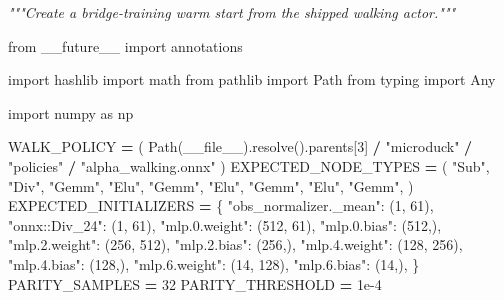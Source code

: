 \documentclass[
  american,
  11pt,
  letterpaper,
]{article}
\newenvironment{Shaded}{\begin{snugshade}}{\end{snugshade}}
\newcommand{\CommentTok}[1]{\textcolor[rgb]{0.56,0.35,0.01}{\textit{#1}}}
\newcommand{\DecValTok}[1]{\textcolor[rgb]{0.00,0.00,0.81}{#1}}
\newcommand{\FloatTok}[1]{\textcolor[rgb]{0.00,0.00,0.81}{#1}}
\newcommand{\ImportTok}[1]{#1}
\newcommand{\NormalTok}[1]{#1}
\newcommand{\OperatorTok}[1]{\textcolor[rgb]{0.81,0.36,0.00}{\textbf{#1}}}
\newcommand{\StringTok}[1]{\textcolor[rgb]{0.31,0.60,0.02}{#1}}
\newcommand{\VariableTok}[1]{\textcolor[rgb]{0.00,0.00,0.00}{#1}}
\renewenvironment{Shaded}{\par\smallskip}{\par\smallskip}
\begin{document}
\begin{Shaded}
\begin{Highlighting}[]
\CommentTok{"""Create a bridge{-}training warm start from the shipped walking actor."""}

\ImportTok{from}\NormalTok{ \_\_future\_\_ }\ImportTok{import}\NormalTok{ annotations}

\ImportTok{import}\NormalTok{ hashlib}
\ImportTok{import}\NormalTok{ math}
\ImportTok{from}\NormalTok{ pathlib }\ImportTok{import}\NormalTok{ Path}
\ImportTok{from}\NormalTok{ typing }\ImportTok{import}\NormalTok{ Any}

\ImportTok{import}\NormalTok{ numpy }\ImportTok{as}\NormalTok{ np}


\NormalTok{WALK\_POLICY }\OperatorTok{=}\NormalTok{ (}
\NormalTok{    Path(}\VariableTok{\_\_file\_\_}\NormalTok{).resolve().parents[}\DecValTok{3}\NormalTok{] }\OperatorTok{/} \StringTok{"microduck"} \OperatorTok{/} \StringTok{"policies"} \OperatorTok{/} \StringTok{"alpha\_walking.onnx"}
\NormalTok{)}
\NormalTok{EXPECTED\_NODE\_TYPES }\OperatorTok{=}\NormalTok{ (}
    \StringTok{"Sub"}\NormalTok{,}
    \StringTok{"Div"}\NormalTok{,}
    \StringTok{"Gemm"}\NormalTok{,}
    \StringTok{"Elu"}\NormalTok{,}
    \StringTok{"Gemm"}\NormalTok{,}
    \StringTok{"Elu"}\NormalTok{,}
    \StringTok{"Gemm"}\NormalTok{,}
    \StringTok{"Elu"}\NormalTok{,}
    \StringTok{"Gemm"}\NormalTok{,}
\NormalTok{)}
\NormalTok{EXPECTED\_INITIALIZERS }\OperatorTok{=}\NormalTok{ \{}
    \StringTok{"obs\_normalizer.\_mean"}\NormalTok{: (}\DecValTok{1}\NormalTok{, }\DecValTok{61}\NormalTok{),}
    \StringTok{"onnx::Div\_24"}\NormalTok{: (}\DecValTok{1}\NormalTok{, }\DecValTok{61}\NormalTok{),}
    \StringTok{"mlp.0.weight"}\NormalTok{: (}\DecValTok{512}\NormalTok{, }\DecValTok{61}\NormalTok{),}
    \StringTok{"mlp.0.bias"}\NormalTok{: (}\DecValTok{512}\NormalTok{,),}
    \StringTok{"mlp.2.weight"}\NormalTok{: (}\DecValTok{256}\NormalTok{, }\DecValTok{512}\NormalTok{),}
    \StringTok{"mlp.2.bias"}\NormalTok{: (}\DecValTok{256}\NormalTok{,),}
    \StringTok{"mlp.4.weight"}\NormalTok{: (}\DecValTok{128}\NormalTok{, }\DecValTok{256}\NormalTok{),}
    \StringTok{"mlp.4.bias"}\NormalTok{: (}\DecValTok{128}\NormalTok{,),}
    \StringTok{"mlp.6.weight"}\NormalTok{: (}\DecValTok{14}\NormalTok{, }\DecValTok{128}\NormalTok{),}
    \StringTok{"mlp.6.bias"}\NormalTok{: (}\DecValTok{14}\NormalTok{,),}
\NormalTok{\}}
\NormalTok{PARITY\_SAMPLES }\OperatorTok{=} \DecValTok{32}
\NormalTok{PARITY\_THRESHOLD }\OperatorTok{=} \FloatTok{1e{-}4}



\end{Highlighting}
\end{Shaded}
\end{document}
